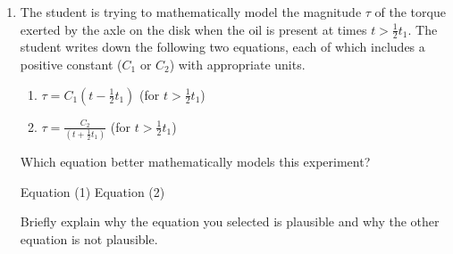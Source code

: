 \documentclass{../../../oss-apphys}
\begin{document}
\begin{enumerate}[leftmargin=15pt]
\begin{enumerate}[leftmargin=15pt]
   \item The student is trying to mathematically model the magnitude $\tau$ of
     the torque exerted by the axle on the disk when the oil is present at
     times $\displaystyle t>\frac12t_1$. The student writes down the following
     two equations, each of which includes a positive constant ($C_1$ or $C_2$)
     with appropriate units.
     \begin{enumerate}[label={(\arabic*)},leftmargin=15pt]
     \item$\displaystyle\tau=C_1\left(t-\frac12t_1\right)$ (for $t>\frac12 t_1$)
     \item$\displaystyle\tau=\frac{C_2}{\left(t+\frac12t_1\right)}$ (for
       $t>\frac12t_1$)
     \end{enumerate}
     Which equation better mathematically models this experiment?

     \vspace{.1in}
     \underline{\hspace{.3in}}Equation (1)\hspace{.2in}
     \underline{\hspace{.3in}}Equation (2)
     
     \vspace{.1in}Briefly explain why the equation you selected is plausible
     and why the other equation is not plausible.
  \end{enumerate}
\end{enumerate}
\end{document}
